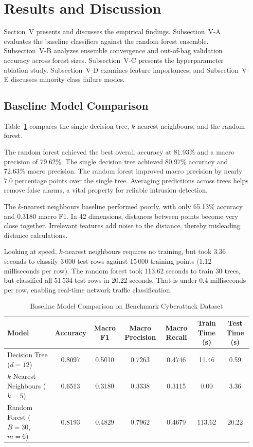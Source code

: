 \documentclass[conference,10pt]{IEEEtran}
\begin{document}
\section{Results and Discussion}

Section~V presents and discusses the empirical findings. Subsection~V-A evaluates the baseline classifiers against the random forest ensemble. Subsection~V-B analyzes ensemble convergence and out-of-bag validation accuracy across forest sizes. Subsection~V-C presents the hyperparameter ablation study. Subsection~V-D examines feature importances, and Subsection~V-E discusses minority class failure modes.

\subsection{Baseline Model Comparison}

Table~\ref{tab:baseline_comparison} compares the single decision tree, $k$-nearest neighbours, and the random forest.

The random forest achieved the best overall accuracy at 81.93\% and a macro precision of 79.62\%. The single decision tree achieved 80.97\% accuracy and 72.63\% macro precision. The random forest improved macro precision by nearly 7.0 percentage points over the single tree. Averaging predictions across trees helps remove false alarms, a vital property for reliable intrusion detection.

The $k$-nearest neighbours baseline performed poorly, with only 65.13\% accuracy and 0.3180 macro F1. In 42 dimensions, distances between points become very close together. Irrelevant features add noise to the distance, thereby misleading distance calculations.

Looking at speed, $k$-nearest neighbours requires no training, but took 3.36 seconds to classify 3\,000 test rows against 15\,000 training points (1.12 milliseconds per row). The random forest took 113.62 seconds to train 30 trees, but classified all 51\,534 test rows in 20.22 seconds. That is under 0.4 milliseconds per row, enabling real-time network traffic classification.

\begin{table}[t]
\centering
\caption{Baseline Model Comparison on Benchmark Cyberattack Dataset}
\label{tab:baseline_comparison}
\setlength{\tabcolsep}{6pt}
\small
\begin{tabular}{lcccccc}
\toprule
Model & Accuracy & Macro F1 & Macro Precision & Macro Recall & Train Time (s) & Test Time (s) \\
\midrule
Decision Tree ($d=12$) & 0.8097 & 0.5010 & 0.7263 & 0.4746 & 11.46 & 0.59 \\
$k$-Nearest Neighbours ($k=5$) & 0.6513 & 0.3180 & 0.3338 & 0.3115 & 0.00 & 3.36 \\
Random Forest ($B=30$, $m=6$) & 0.8193 & 0.4829 & 0.7962 & 0.4679 & 113.62 & 20.22 \\
\bottomrule
\end{tabular}
\end{table}
\end{document}
